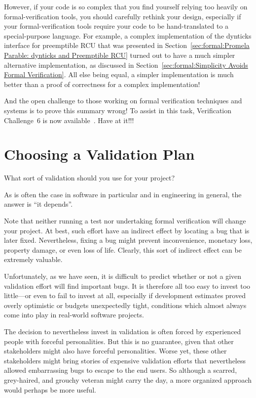 However, if your code is so complex that you find yourself
relying too heavily on formal-verification
tools, you should carefully rethink your design, especially if your
formal-verification tools require your code to be hand-translated
to a special-purpose language.
For example, a complex implementation of the dynticks interface for
preemptible RCU that was presented in
Section~\ref{sec:formal:Promela Parable: dynticks and Preemptible RCU}
turned out to
have a much simpler alternative implementation, as discussed in
Section~\ref{sec:formal:Simplicity Avoids Formal Verification}.
All else being equal, a simpler implementation is much better than
a proof of correctness for a complex implementation!

And the open challenge to those working on formal verification techniques
and systems is to prove this summary wrong!
To assist in this task, Verification Challenge~6 is now
available~\cite{PaulEMcKenney2017VerificationChallenge6}.
Have at it!!!

\section{Choosing a Validation Plan}
\label{sec:formal:Choosing a Validation Plan}

What sort of validation should you use for your project?

As is often the case in software in particular and in engineering
in general, the answer is ``it depends''.

Note that neither running a test nor undertaking formal verification
will change your project.
At best, such effort have an indirect effect by locating a bug that
is later fixed.
Nevertheless, fixing a bug might prevent inconvenience, monetary loss,
property damage, or even loss of life.
Clearly, this sort of indirect effect can be extremely valuable.

Unfortunately, as we have seen, it is difficult to predict whether or
not a given validation effort will find important bugs.
It is therefore all too easy to invest too little---or even to fail
to invest at all, especially if development estimates proved overly
optimistic or budgets unexpectedly tight, conditions which almost
always come into play in real-world software projects.

The decision to nevertheless invest in validation is often forced by
experienced people with forceful personalities.
But this is no guarantee, given that other stakeholders might also
have forceful personalities.
Worse yet, these other stakeholders might bring stories of expensive
validation efforts that nevertheless allowed embarrassing bugs to
escape to the end users.
So although a scarred, grey-haired, and grouchy veteran might carry
the day, a more organized approach would perhaps be more useful.

